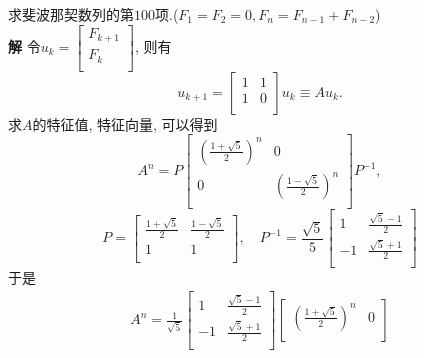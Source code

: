 \begin{example}
    求斐波那契数列的第$100$项.($F_1=F_2=0, F_{n} = F_{n-1} + F_{n-2}$)
    \\
    \textbf{解 } 令$u_{k} = \begin{bmatrix}
     F_{k+1}\\
     F_{k}\\
    \end{bmatrix}$, 则有
    \begin{equation}
        u_{k+1} = \begin{bmatrix}
            1&1\\
            1&0\\
        \end{bmatrix} u_{k} \equiv A u_k.
    \end{equation}
    求$A$的特征值, 特征向量, 可以得到
    \begin{equation}
      A^{n} = P \begin{bmatrix}
       \left( \frac{1+\sqrt{5}}{2} \right) ^{n} & 0\\
       0 & \left( \frac{1-\sqrt{5}}{2} \right) ^{n}\\
      \end{bmatrix}
      P ^{-1},
    \end{equation}
    \begin{equation}
      P = \begin{bmatrix}
       \frac{1+\sqrt{5}}{2} & \frac{1-\sqrt{5}}{2}\\
       1 & 1\\
      \end{bmatrix},
      \quad
      P ^{-1} = \frac{\sqrt{5}}{5}\begin{bmatrix}
       1 & \frac{\sqrt{5}-1}{2}\\
       -1 & \frac{\sqrt{5}+1}{2}\\
      \end{bmatrix}
    \end{equation}
    于是
    \begin{equation}
        \begin{aligned}
            A ^{n} = \frac{1}{\sqrt{5}}\begin{bmatrix}
             1 & \frac{\sqrt{5}-1}{2}\\
             -1 & \frac{\sqrt{5}+1}{2}\\
              \end{bmatrix}
              \begin{bmatrix}
               \left( \frac{1+\sqrt{5}}{2} \right) ^{n} & 0\\

\end{bmatrix}
\end{aligned}
\end{equation}
\end{example}
